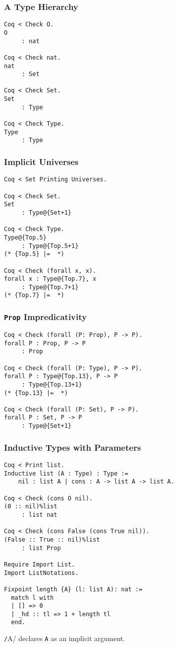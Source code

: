 \documentclass{beamer}
\begin{document}
\begin{frame}[fragile]
\frametitle{A Type Hierarchy}
\begin{verbatim}
Coq < Check O.
O
     : nat

Coq < Check nat.
nat
     : Set

Coq < Check Set.
Set
     : Type

Coq < Check Type.     
Type
     : Type
\end{verbatim}
\end{frame}
\begin{frame}[fragile]
\frametitle{Implicit Universes}
\begin{verbatim}
Coq < Set Printing Universes.

Coq < Check Set.
Set
     : Type@{Set+1}

Coq < Check Type.
Type@{Top.5}
     : Type@{Top.5+1}
(* {Top.5} |=  *)

Coq < Check (forall x, x).
forall x : Type@{Top.7}, x
     : Type@{Top.7+1}
(* {Top.7} |=  *)
\end{verbatim}
\end{frame}
\begin{frame}[fragile]
\frametitle{\texttt{Prop} Impredicativity}
\begin{verbatim}
Coq < Check (forall (P: Prop), P -> P).
forall P : Prop, P -> P
     : Prop

Coq < Check (forall (P: Type), P -> P).
forall P : Type@{Top.13}, P -> P
     : Type@{Top.13+1}
(* {Top.13} |=  *)

Coq < Check (forall (P: Set), P -> P).
forall P : Set, P -> P
     : Type@{Set+1}
\end{verbatim}
\end{frame}

\begin{frame}[fragile]
\frametitle{Inductive Types with Parameters}
\small
\begin{verbatim}
Coq < Print list.
Inductive list (A : Type) : Type :=
    nil : list A | cons : A -> list A -> list A.

Coq < Check (cons O nil).
(0 :: nil)%list
     : list nat

Coq < Check (cons False (cons True nil)).
(False :: True :: nil)%list
     : list Prop

Require Import List.
Import ListNotations.

Fixpoint length {A} (l: list A): nat :=
  match l with
  | [] => 0
  | _hd :: tl => 1 + length tl
  end.
\end{verbatim}
\texttt/{A}/ declares \texttt{A} as an implicit argument.
\end{frame}
\end{document}
